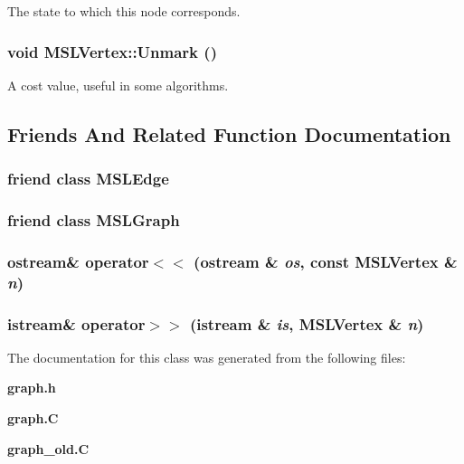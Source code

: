 The state to which this node corresponds.

\subsubsection{\setlength{\rightskip}{0pt plus 5cm}void MSLVertex::Unmark ()\hspace{0.3cm}{\tt  [inline]}}\label{classMSLVertex_a7}


A cost value, useful in some algorithms.



\subsection{Friends And Related Function Documentation}
\subsubsection{\setlength{\rightskip}{0pt plus 5cm}friend class MSLEdge\hspace{0.3cm}{\tt  [friend]}}\label{classMSLVertex_l0}


\subsubsection{\setlength{\rightskip}{0pt plus 5cm}friend class MSLGraph\hspace{0.3cm}{\tt  [friend]}}\label{classMSLVertex_l1}


\subsubsection{\setlength{\rightskip}{0pt plus 5cm}ostream\& operator$<$$<$ (ostream \& {\em os}, const MSLVertex \& {\em n})\hspace{0.3cm}{\tt  [friend]}}\label{classMSLVertex_l3}


\subsubsection{\setlength{\rightskip}{0pt plus 5cm}istream\& operator$>$$>$ (istream \& {\em is}, MSLVertex \& {\em n})\hspace{0.3cm}{\tt  [friend]}}\label{classMSLVertex_l2}




The documentation for this class was generated from the following files:\begin{CompactItemize}
\item 
{\bf graph.h}\item 
{\bf graph.C}\item 
{\bf graph\_\-old.C}\end{CompactItemize}
